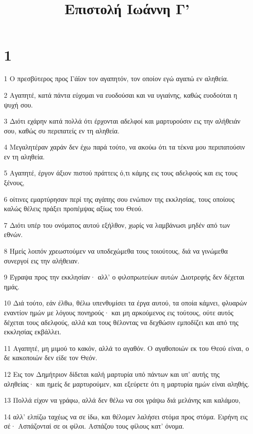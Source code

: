 

\title{Επιστολή Ιωάννη Γ'}


\chapter{1}

\par 1 Ο πρεσβύτερος προς Γάϊον τον αγαπητόν, τον οποίον εγώ αγαπώ εν αληθεία.
\par 2 Αγαπητέ, κατά πάντα εύχομαι να ευοδούσαι και να υγιαίνης, καθώς ευοδούται η ψυχή σου.
\par 3 Διότι εχάρην κατά πολλά ότι έρχονται αδελφοί και μαρτυρούσιν εις την αλήθειάν σου, καθώς συ περιπατείς εν τη αληθεία.
\par 4 Μεγαλητέραν χαράν δεν έχω παρά τούτο, να ακούω ότι τα τέκνα μου περιπατούσιν εν τη αληθεία.
\par 5 Αγαπητέ, έργον άξιον πιστού πράττεις ό,τι κάμης εις τους αδελφούς και εις τους ξένους,
\par 6 οίτινες εμαρτύρησαν περί της αγάπης σου ενώπιον της εκκλησίας, τους οποίους καλώς θέλεις πράξει προπέμψας αξίως του Θεού.
\par 7 Διότι υπέρ του ονόματος αυτού εξήλθον, χωρίς να λαμβάνωσι μηδέν από των εθνών.
\par 8 Ημείς λοιπόν χρεωστούμεν να υποδεχώμεθα τους τοιούτους, διά να γινώμεθα συνεργοί εις την αλήθειαν.
\par 9 Έγραψα προς την εκκλησίαν· αλλ' ο φιλοπρωτεύων αυτών Διοτρεφής δεν δέχεται ημάς.
\par 10 Διά τούτο, εάν έλθω, θέλω υπενθυμίσει τα έργα αυτού, τα οποία κάμνει, φλυαρών εναντίον ημών με λόγους πονηρούς· και μη αρκούμενος εις τούτους, ούτε αυτός δέχεται τους αδελφούς, αλλά και τους θέλοντας να δεχθώσιν εμποδίζει και από της εκκλησίας εκβάλλει.
\par 11 Αγαπητέ, μη μιμού το κακόν, αλλά το αγαθόν. Ο αγαθοποιών εκ του Θεού είναι, ο δε κακοποιών δεν είδε τον Θεόν.
\par 12 Εις τον Δημήτριον δίδεται καλή μαρτυρία υπό πάντων και υπ' αυτής της αληθείας· και ημείς δε μαρτυρούμεν, και εξεύρετε ότι η μαρτυρία ημών είναι αληθής.
\par 13 Πολλά είχον να γράφω, αλλά δεν θέλω να σοι γράψω διά μελάνης και καλάμου,
\par 14 αλλ' ελπίζω ταχέως να σε ίδω, και θέλομεν λαλήσει στόμα προς στόμα. Ειρήνη εις σέ· Ασπάζονταί σε οι φίλοι. Ασπάζου τους φίλους κατ' όνομα.


